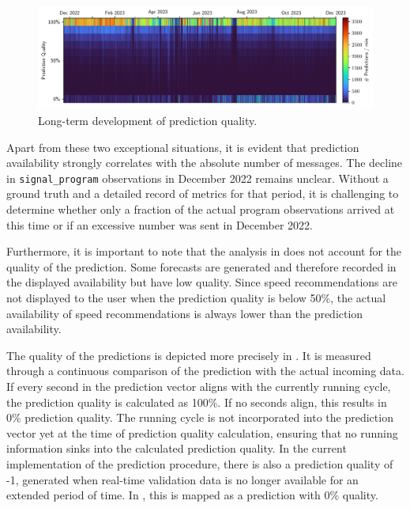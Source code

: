 \begin{figure}[t]
    \centering
    \includegraphics[width=\linewidth]{images/monitoring-long-term-study.pdf}
    \caption{Long-term development of prediction quality.}\label{fig:monitoring-long-term-study}
\end{figure}

Apart from these two exceptional situations, it is evident that prediction availability strongly correlates with the absolute number of messages. The decline in \texttt{signal\_program} observations in December 2022 remains unclear. Without a ground truth and a detailed record of metrics for that period, it is challenging to determine whether only a fraction of the actual program observations arrived at this time or if an excessive number was sent in December 2022.

Furthermore, it is important to note that the analysis in  does not account for the quality of the prediction. Some forecasts are generated and therefore recorded in the displayed availability but have low quality. Since speed recommendations are not displayed to the user when the prediction quality is below 50\%, the actual availability of speed recommendations is always lower than the prediction availability.

The quality of the predictions is depicted more precisely in . It is measured through a continuous comparison of the prediction with the actual incoming data. If every second in the prediction vector aligns with the currently running cycle, the prediction quality is calculated as 100\%. If no seconds align, this results in 0\% prediction quality. The running cycle is not incorporated into the prediction vector yet at the time of prediction quality calculation, ensuring that no running information sinks into the calculated prediction quality. In the current implementation of the prediction procedure, there is also a prediction quality of -1, generated when real-time validation data is no longer available for an extended period of time. In , this is mapped as a prediction with 0\% quality.

